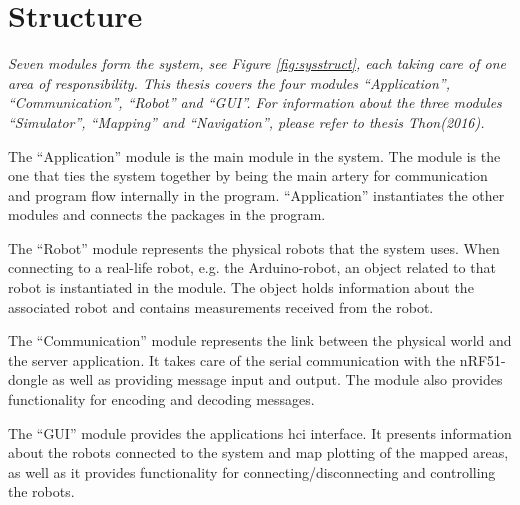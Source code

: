 \section{Structure}
\label{secr:structure}
\textit{Seven modules form the system, see Figure \ref{fig:sysstruct}, each taking care of one area of responsibility. This thesis covers the four modules ``Application'', ``Communication'', ``Robot'' and ``GUI''. For information about the three modules ``Simulator'', ``Mapping'' and ``Navigation'', please refer to thesis Thon(2016).}

The ``Application'' module is the main module in the system. The module is the one that ties the system together by being the main artery for communication and program flow internally in the program. ``Application'' instantiates the other modules and connects the packages in the program.

The ``Robot'' module represents the physical robots that the system uses. When connecting to a real-life robot, e.g. the Arduino-robot, an object related to that robot is instantiated in the module. The object holds information about the associated robot and contains measurements received from the robot.

The ``Communication'' module represents the link between the physical world and the server application. It takes care of the serial communication with the nRF51-dongle as well as providing message input and output. The module also provides functionality for encoding and decoding messages.

The ``GUI'' module provides the applications \acrshort{hci} interface. It presents information about the robots connected to the system and map plotting of the mapped areas, as well as it provides functionality for connecting/disconnecting and controlling the robots.


